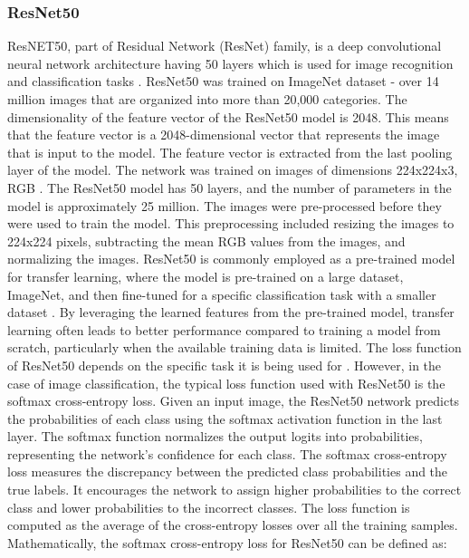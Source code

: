 \documentclass[12pt,a4paper]{article}
\begin{document}
\subsubsection{ResNet50}
ResNET50, part of Residual Network (ResNet) family, is a deep convolutional neural network architecture having 50 layers which is used for image recognition and classification tasks \cite{DBLP:journals/corr/HeZRS15}. ResNet50 was trained on ImageNet dataset - over 14 million images that are organized into more than 20,000 categories. The dimensionality of the feature vector of the ResNet50 model is 2048. This means that the feature vector is a 2048-dimensional vector that represents the image that is input to the model. The feature vector is extracted from the last pooling layer of the model. The network was trained on images of dimensions 224x224x3, RGB \cite{DBLP:journals/corr/HeZRS15}. The ResNet50 model has 50 layers, and the number of parameters in the model is approximately 25 million. The images were pre-processed before they were used to train the model. This preprocessing included resizing the images to 224x224 pixels, subtracting the mean RGB values from the images, and normalizing the images. ResNet50 is commonly employed as a pre-trained model for transfer learning, where the model is pre-trained on a large dataset, ImageNet, and then fine-tuned for a specific classification task with a smaller dataset \cite{DBLP:journals/corr/HeZRS15}. By leveraging the learned features from the pre-trained model, transfer learning often leads to better performance compared to training a model from scratch, particularly when the available training data is limited. The loss function of ResNet50 depends on the specific task it is being used for \cite{DBLP:journals/corr/HeZRS15}. However, in the case of image classification, the typical loss function used with ResNet50 is the softmax cross-entropy loss. Given an input image, the ResNet50 network predicts the probabilities of each class using the softmax activation function in the last layer. The softmax function normalizes the output logits into probabilities, representing the network's confidence for each class. The softmax cross-entropy loss measures the discrepancy between the predicted class probabilities and the true labels. It encourages the network to assign higher probabilities to the correct class and lower probabilities to the incorrect classes. The loss function is computed as the average of the cross-entropy losses over all the training samples. Mathematically, the softmax cross-entropy loss for ResNet50 can be defined as:
\end{document}
